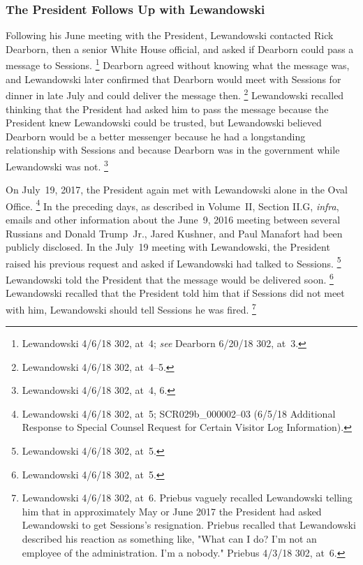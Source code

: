\subsubsection{The President Follows Up with Lewandowski}

Following his June meeting with the President, Lewandowski contacted Rick Dearborn, then a senior White House official, and asked if Dearborn could pass a message to Sessions.%
\footnote{Lewandowski 4/6/18 302, at~4;
\textit{see} Dearborn 6/20/18 302, at~3.}
Dearborn agreed without knowing what the message was, and Lewandowski later confirmed that Dearborn would meet with Sessions for dinner in late July and could deliver the message then.%
\footnote{Lewandowski 4/6/18 302, at~4--5.}
Lewandowski recalled thinking that the President had asked him to pass the message because the President knew Lewandowski could be trusted, but Lewandowski believed Dearborn would be a better messenger because he had a longstanding relationship with Sessions and because Dearborn was in the government while Lewandowski was not.%
\footnote{Lewandowski 4/6/18 302, at~4, 6.}

On July~19, 2017, the President again met with Lewandowski alone in the Oval Office.%
\footnote{Lewandowski 4/6/18 302, at~5;
SCR029b\_000002--03 (6/5/18 Additional Response to Special Counsel Request for Certain Visitor Log Information).}
In the preceding days, as described in Volume~II, Section II.G, \textit{infra}, emails and other information about the June~9, 2016 meeting between several Russians and Donald Trump~Jr., Jared Kushner, and Paul Manafort had been publicly disclosed.
In the July~19 meeting with Lewandowski, the President raised his previous request and asked if Lewandowski had talked to Sessions.%
\footnote{Lewandowski 4/6/18 302, at~5.}
Lewandowski told the President that the message would be delivered soon.%
\footnote{Lewandowski 4/6/18 302, at~5.}
Lewandowski recalled that the President told him that if Sessions did not meet with him, Lewandowski should tell Sessions he was fired.%
\footnote{Lewandowski 4/6/18 302, at~6.
Priebus vaguely recalled Lewandowski telling him that in approximately May or June 2017 the President had asked Lewandowski to get Sessions's resignation.
Priebus recalled that Lewandowski described his reaction as something like, "What can I do?
I'm not an employee of the administration.
I'm a nobody."
Priebus 4/3/18 302, at~6.}

